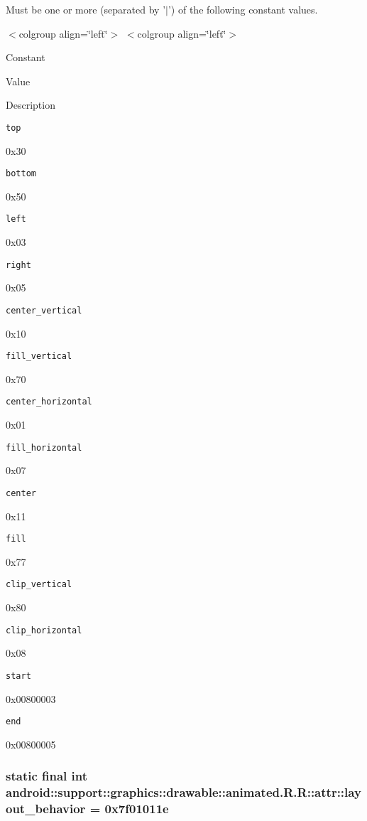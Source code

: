 Must be one or more (separated by '$|$') of the following constant values. \begin{TabularC}{0}
\hline
\end{TabularC}
$<$colgroup align=\char`\"{}left\char`\"{}$>$ $<$colgroup align=\char`\"{}left\char`\"{}$>$ 

Constant

Value

Description 

{\tt top}

0x30

{\tt bottom}

0x50

{\tt left}

0x03

{\tt right}

0x05

{\tt center\_\-vertical}

0x10

{\tt fill\_\-vertical}

0x70

{\tt center\_\-horizontal}

0x01

{\tt fill\_\-horizontal}

0x07

{\tt center}

0x11

{\tt fill}

0x77

{\tt clip\_\-vertical}

0x80

{\tt clip\_\-horizontal}

0x08

{\tt start}

0x00800003

{\tt end}

0x00800005\hypertarget{classandroid_1_1support_1_1graphics_1_1drawable_1_1animated_1_1_r_1_1attr_1597bbb9aa3502f32bdefcb92b9048f3}{
\subsubsection[{layout\_\-behavior}]{\setlength{\rightskip}{0pt plus 5cm}static final int android::support::graphics::drawable::animated.R.R::attr::layout\_\-behavior = 0x7f01011e}}
\label{classandroid_1_1support_1_1graphics_1_1drawable_1_1animated_1_1_r_1_1attr_1597bbb9aa3502f32bdefcb92b9048f3}


